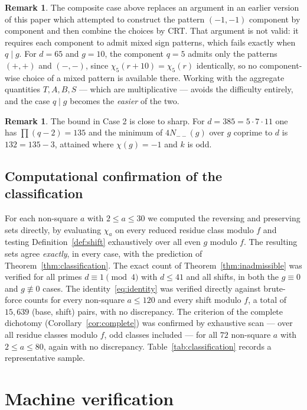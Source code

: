 \documentclass[11pt,reqno]{amsart}
\theoremstyle{plain}
\theoremstyle{definition}
\newtheorem{remark}[theorem]{Remark}
\begin{document}
\begin{remark}
\label{rem:oldproof}
The composite case above replaces an argument in an earlier version of this
paper which attempted to construct the pattern $(-1,-1)$ component by
component and then combine the choices by CRT. That argument is not valid: it
requires each component to admit mixed sign patterns, which fails exactly when
$q \mid g$. For $d = 65$ and $g = 10$, the component $q = 5$ admits only the
patterns $(+,+)$ and $(-,-)$, since $\chi_5(r+10) = \chi_5(r)$ identically, so
no component-wise choice of a mixed pattern is available there. Working with
the aggregate quantities $T, A, B, S$ --- which are multiplicative --- avoids
the difficulty entirely, and the case $q \mid g$ becomes the \emph{easier} of
the two.
\end{remark}

\begin{remark}
The bound in Case 2 is close to sharp. For $d = 385 = 5 \cdot 7 \cdot 11$ one
has $\prod (q-2) = 135$ and the minimum of $4N_{--}(g)$ over $g$ coprime to
$d$ is $132 = 135 - 3$, attained where $\chi(g) = -1$ and $k$ is odd.
\end{remark}

\subsection*{Computational confirmation of the classification}
For each non-square $a$ with $2 \le a \le 30$ we computed the reversing and
preserving sets directly, by evaluating $\chi_a$ on every reduced residue
class modulo $f$ and testing Definition~\ref{def:shift} exhaustively over all
even $g$ modulo $f$. The resulting sets agree \emph{exactly}, in every case,
with the prediction of Theorem~\ref{thm:classification}. The exact count of
Theorem~\ref{thm:inadmissible} was verified for all primes
$d \equiv 1 \pmod 4$ with $d \le 41$ and all shifts, in both the $g \equiv 0$
and $g \not\equiv 0$ cases. The identity~\eqref{eq:identity} was verified
directly against brute-force counts for every non-square $a \le 120$ and every
shift modulo $f$, a total of $15{,}639$ (base, shift) pairs, with no
discrepancy. The criterion of the complete dichotomy
(Corollary~\ref{cor:complete}) was confirmed by exhaustive scan --- over all
residue classes modulo $f$, odd classes included --- for all $72$ non-square
$a$ with $2 \le a \le 80$, again with no discrepancy.
Table~\ref{tab:classification} records a representative sample.

\section{Machine verification}
\label{sec:formal}
\end{document}
